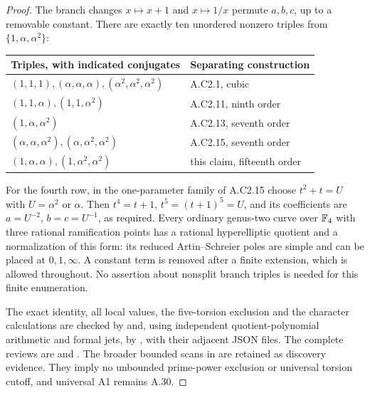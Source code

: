 \begin{proof}
The branch changes $x\mapsto x+1$ and $x\mapsto1/x$
permute $a,b,c$, up to a removable constant.
There are exactly ten unordered nonzero triples
from $\{1,\alpha,\alpha^2\}$:
\begin{center}
\begin{tabular}{ll}
\toprule
Triples, with indicated conjugates & Separating construction\\
\midrule
$(1,1,1),(\alpha,\alpha,\alpha),(\alpha^2,\alpha^2,\alpha^2)$
  & A.C2.1, cubic\\
$(1,1,\alpha),(1,1,\alpha^2)$ & A.C2.11, ninth order\\
$(1,\alpha,\alpha^2)$ & A.C2.13, seventh order\\
$(\alpha,\alpha,\alpha^2),(\alpha,\alpha^2,\alpha^2)$
  & A.C2.15, seventh order\\
$(1,\alpha,\alpha),(1,\alpha^2,\alpha^2)$
  & this claim, fifteenth order\\
\bottomrule
\end{tabular}
\end{center}
For the fourth row, in the one-parameter family
of A.C2.15 choose $t^2+t=U$ with
$U=\alpha^2$ or $\alpha$. Then
$t^4=t+1$, $t^5=(t+1)^5=U$, and its coefficients
are $a=U^{-2}$, $b=c=U^{-1}$, as required.
Every ordinary genus-two curve over $\mathbb F_4$ with
three rational ramification points has a rational
hyperelliptic quotient and a normalization of
this form: its reduced Artin--Schreier poles
are simple and can be placed at $0,1,\infty$.
A constant term is removed after a finite
extension, which is allowed throughout.
No assertion about nonsplit branch triples
is needed for this finite enumeration.

The exact identity, all local values, the
five-torsion exclusion and the character
calculations are checked by
and, using independent quotient-polynomial
arithmetic and formal jets, by
,
with their adjacent JSON files.
The complete reviews are
 and
.
The broader bounded scans in
 are retained
as discovery evidence. They imply no unbounded
prime-power exclusion or universal torsion
cutoff, and universal A1 remains A.30.
\end{proof}




